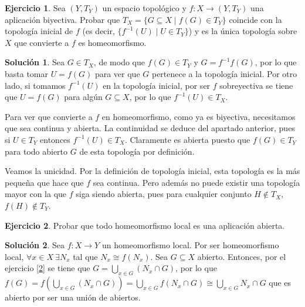 \documentclass{article}
\theoremstyle{plain}
\theoremstyle{definition}
\newtheorem{exercise}{Ejercicio}
\newtheorem*{sol*}{Solución}
\begin{document}
\begin{exercise}
Sea $(Y,T_Y)$ un espacio topológico y $f:X\longrightarrow (Y,T_Y)$ una aplicación biyectiva. Probar que $T_X=\{G\subseteq X\mid f(G)\in T_Y\}$ coincide con la topología inicial de $f$ (es decir, $\{f^{-1}(U)\mid U\in T_Y\}$) y es la única topología sobre $X$ que convierte a $f$ es homeomorfismo. 
\end{exercise}

\begin{sol*}
Sea $G\in T_X$, de modo que $f(G)\in T_Y$ y $G=f^{-1}f(G)$, por lo que basta tomar $U=f(G)$ para ver que $G$ pertenece a la topología inicial. Por otro lado, si tomamos $f^{-1}(U)$ en la topología inicial, por ser $f$ sobreyectiva se tiene que $U=f(G)$ para algún $G\subseteq X$, por lo que $f^{-1}(U)\in T_X$.

Para ver que convierte a $f$ en homeomorfismo, como ya es biyectiva, necesitamos que sea continua y abierta. La continuidad se deduce del apartado anterior, pues si $U\in T_Y$ entonces $f^{-1}(U)\in T_X$. Claramente es abierta puesto que $f(G)\in T_Y$ para todo abierto $G$ de esta topología por definición. 

Veamos la unicidad. Por la definición de topología inicial, esta topología es la más pequeña que hace que $f$ sea continua. Pero además no puede existir una topología mayor con la que $f$ siga siendo abierta, pues para cualquier conjunto $H\notin T_X$, $f(H)\notin T_Y$.
\end{sol*}

\begin{exercise}
Probar que todo homeomorfismo local es una aplicación abierta.
\end{exercise}

\begin{sol*}
Sea $f:X\to Y$ un homeomorfismo local. Por ser homeomorfismo local, $\forall x\in X\ \exists N_x$ tal que $N_x\cong f(N_x)$. Sea $G\subseteq X$ abierto. Entonces, por el ejercicio \ref{2} se tiene que $G=\bigcup_{x\in G} (N_x\cap G)$, por lo que $f(G)=f(\bigcup_{x\in G} (N_x\cap G))=\bigcup_{x\in G}f(N_x\cap G)\cong \bigcup_{x\in G} N_x\cap G$ que es abierto por ser una unión de abiertos.
\end{sol*}
\end{document}

